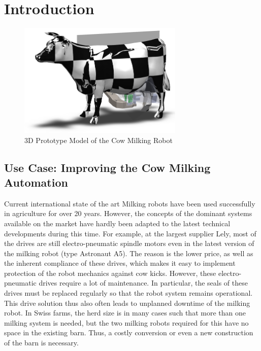 \chapter{Introduction}\label{chap:introduction}
   \begin{figure}[!ht]
        \centering
        \includegraphics[width=0.7\textwidth]{images/cow_system.png}
        \caption{3D Prototype Model of the Cow Milking Robot}
        \label{fig:cow_fmc}
    \end{figure}
    
\section{Use Case: Improving the Cow Milking Automation}\label{chap:3:use-case}

Current international state of the art
Milking robots have been used successfully in agriculture for over 20 years. However, the concepts of the dominant systems available on the market have hardly been adapted to the latest technical developments during this time. For example, at the largest supplier Lely, most of the drives are still electro-pneumatic spindle motors even in the latest version of the milking robot (type Astronaut A5). The reason is the lower price, as well as the inherent compliance of these drives, which makes it easy to implement protection of the robot mechanics against cow kicks. However, these electro-pneumatic drives require a lot of maintenance. In particular, the seals of these drives must be replaced regularly so that the robot system remains operational. This drive solution thus also often leads to unplanned downtime of the milking robot.
In Swiss farms, the herd size is in many cases such that more than one milking system is needed, but the two milking robots required for this have no space in the existing barn. Thus, a costly conversion or even a new construction of the barn is necessary.

